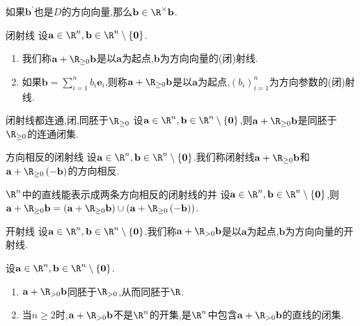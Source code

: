 \begin{remark}{}{}
	如果$\mathbf{b}^{\prime}$也是$D$的方向向量,那么$\mathbf{b}\in\R^{\times}\mathbf{b}$.
\end{remark}

\begin{definition}{闭射线}{}
	设$\mathbf{a}\in\R^{n},\mathbf{b}\in\R^{n}\setminus\left\{\mathbf{0}\right\}$.
	\begin{enumerate}
		\item 我们称$\mathbf{a}+\R_{\geq 0}\mathbf{b}$是以$\mathbf{a}$为起点,$\mathbf{b}$为方向向量的(闭)射线.
		\item 如果$\mathbf{b}=\sum\limits_{i=1}^{n}b_{i}\mathbf{e}_{i}$,则称$\mathbf{a}+\R_{\geq 0}\mathbf{b}$是以$\mathbf{a}$为起点,$\left(b_{i}\right)_{i=1}^{n}$为方向参数的(闭)射线.
	\end{enumerate}
\end{definition}

\begin{proposition}{闭射线都连通,闭,同胚于$\R_{\geq 0}$}{}
	设$\mathbf{a}\in\R^{n},\mathbf{b}\in\R^{n}\setminus\left\{\mathbf{0}\right\}$,则$\mathbf{a}+\R_{\geq 0}\mathbf{b}$是同胚于$\R_{\geq 0}$的连通闭集.
\end{proposition}

\begin{definition}{方向相反的闭射线}{}
	设$\mathbf{a}\in\R^{n},\mathbf{b}\in\R^{n}\setminus\left\{\mathbf{0}\right\}$.我们称闭射线$\mathbf{a}+\R_{\geq 0}\mathbf{b}$和$\mathbf{a}+\R_{\geq 0}\left(-\mathbf{b}\right)$的方向相反.
\end{definition}

\begin{proposition}{$\R^{n}$中的直线能表示成两条方向相反的闭射线的并}{}
	设$\mathbf{a}\in\R^{n},\mathbf{b}\in\R^{n}\setminus\left\{\mathbf{0}\right\}$,则$\mathbf{a}+\R_{\geq 0}\mathbf{b}=\left(\mathbf{a}+\R_{\geq 0}\mathbf{b}\right)\cup\left(\mathbf{a}+\R_{\geq 0}\left(-\mathbf{b}\right)\right)$.
\end{proposition}

\begin{definition}{开射线}{}
	设$\mathbf{a}\in\R^{n},\mathbf{b}\in\R^{n}\setminus\left\{\mathbf{0}\right\}$.我们称$\mathbf{a}+\R_{>0}\mathbf{b}$是以$\mathbf{a}$为起点,$\mathbf{b}$为方向向量的开射线.
\end{definition}

\begin{proposition}{}{}
	设$\mathbf{a}\in\R^{n},\mathbf{b}\in\R^{n}\setminus\left\{\mathbf{0}\right\}$.
	\begin{enumerate}
		\item $\mathbf{a}+\R_{>0}\mathbf{b}$同胚于$\R_{>0}$,从而同胚于$\R$.
		\item 当$n\geq 2$时,$\mathbf{a}+\R_{>0}\mathbf{b}$不是$\R^{n}$的开集,是$\R^{n}$中包含$\mathbf{a}+\R_{>0}\mathbf{b}$的直线的闭集.
	\end{enumerate}
\end{proposition}

